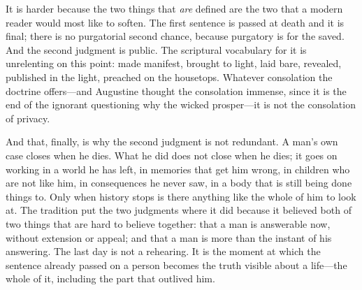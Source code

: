It is harder because the two things that \emph{are} defined are the two that a modern reader would most like to soften. The first sentence is passed at death and it is final; there is no purgatorial second chance, because purgatory is for the saved. And the second judgment is public. The scriptural vocabulary for it is unrelenting on this point: made manifest, brought to light, laid bare, revealed, published in the light, preached on the housetops. Whatever consolation the doctrine offers---and Augustine thought the consolation immense, since it is the end of the ignorant questioning why the wicked prosper---it is not the consolation of privacy.

And that, finally, is why the second judgment is not redundant. A man's own case closes when he dies. What he did does not close when he dies; it goes on working in a world he has left, in memories that get him wrong, in children who are not like him, in consequences he never saw, in a body that is still being done things to. Only when history stops is there anything like the whole of him to look at. The tradition put the two judgments where it did because it believed both of two things that are hard to believe together: that a man is answerable now, without extension or appeal; and that a man is more than the instant of his answering. The last day is not a rehearing. It is the moment at which the sentence already passed on a person becomes the truth visible about a life---the whole of it, including the part that outlived him.
